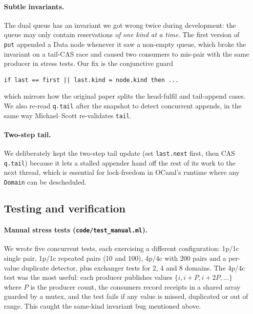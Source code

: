 \documentclass[11pt,a4paper]{article}
\begin{document}
\paragraph{Subtle invariants.}
The dual queue has an invariant we got wrong twice during development:
the queue may only contain reservations \emph{of one kind at a time}.
The first version of \texttt{put} appended a Data node whenever it saw
a non-empty queue, which broke the invariant on a tail-CAS race and
caused two consumers to mis-pair with the same producer in stress
tests. Our fix is the conjunctive guard
\begin{lstlisting}[language=caml]
if last == first || last.kind = node.kind then ...
\end{lstlisting}
which mirrors how the original paper splits the head-fulfil and
tail-append cases. We also re-read \texttt{q.tail} after the snapshot
to detect concurrent appends, in the same way Michael--Scott
re-validates \texttt{tail}.

\paragraph{Two-step tail.}
We deliberately kept the two-step tail update (set \texttt{last.next}
first, then CAS \texttt{q.tail}) because it lets a stalled appender
hand off the rest of its work to the next thread, which is essential
for lock-freedom in OCaml's runtime where any \texttt{Domain} can be
descheduled.

\subsection{Testing and verification}

\paragraph{Manual stress tests
(\texttt{code/test\_manual.ml}).}
We wrote five concurrent tests, each exercising a different
configuration: 1p/1c single pair, 1p/1c repeated pairs (10 and 100),
4p/4c with 200 pairs and a per-value duplicate detector, plus exchanger
tests for 2, 4 and 8 domains. The 4p/4c test was the most useful: each
producer publishes values $\{i, i+P, i+2P, \dots\}$ where $P$ is the
producer count, the consumers record receipts in a shared array
guarded by a mutex, and the test fails if any value is missed,
duplicated or out of range. This caught the same-kind invariant bug
mentioned above.
\end{document}
